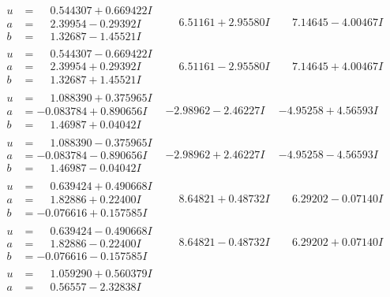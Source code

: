 \documentclass[1p]{elsarticle_modified}
\theoremstyle{definition}
\begin{document}
$$\begin{array}{c|c|c}
\begin{aligned}
u &= \phantom{-}0.544307 + 0.669422 I \\
a &= \phantom{-}2.39954 - 0.29392 I \\
b &= \phantom{-}1.32687 - 1.45521 I\end{aligned}
 & \phantom{-}6.51161 + 2.95580 I & \phantom{-}7.14645 - 4.00467 I \\ \hline\begin{aligned}
u &= \phantom{-}0.544307 - 0.669422 I \\
a &= \phantom{-}2.39954 + 0.29392 I \\
b &= \phantom{-}1.32687 + 1.45521 I\end{aligned}
 & \phantom{-}6.51161 - 2.95580 I & \phantom{-}7.14645 + 4.00467 I \\ \hline\begin{aligned}
u &= \phantom{-}1.088390 + 0.375965 I \\
a &= -0.083784 + 0.890656 I \\
b &= \phantom{-}1.46987 + 0.04042 I\end{aligned}
 & -2.98962 - 2.46227 I & -4.95258 + 4.56593 I \\ \hline\begin{aligned}
u &= \phantom{-}1.088390 - 0.375965 I \\
a &= -0.083784 - 0.890656 I \\
b &= \phantom{-}1.46987 - 0.04042 I\end{aligned}
 & -2.98962 + 2.46227 I & -4.95258 - 4.56593 I \\ \hline\begin{aligned}
u &= \phantom{-}0.639424 + 0.490668 I \\
a &= \phantom{-}1.82886 + 0.22400 I \\
b &= -0.076616 + 0.157585 I\end{aligned}
 & \phantom{-}8.64821 + 0.48732 I & \phantom{-}6.29202 - 0.07140 I \\ \hline\begin{aligned}
u &= \phantom{-}0.639424 - 0.490668 I \\
a &= \phantom{-}1.82886 - 0.22400 I \\
b &= -0.076616 - 0.157585 I\end{aligned}
 & \phantom{-}8.64821 - 0.48732 I & \phantom{-}6.29202 + 0.07140 I \\ \hline\begin{aligned}
u &= \phantom{-}1.059290 + 0.560379 I \\
a &= \phantom{-}0.56557 - 2.32838 I \\

\end{aligned}
\end{array}$$
\end{document}
